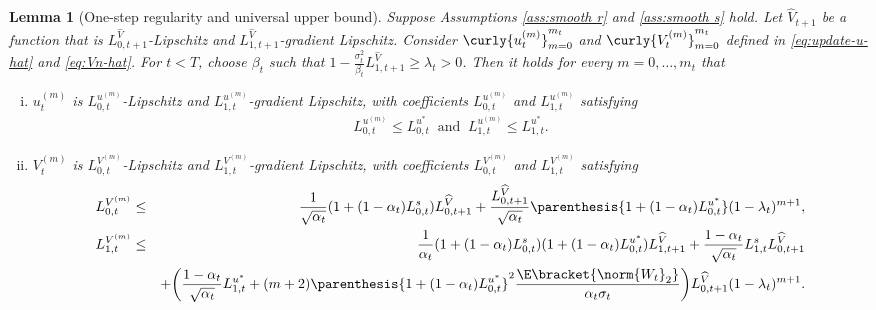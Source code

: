 \documentclass{article}
\newtheorem{Lemma}[Theorem]{Lemma}
\begin{document}
\begin{Lemma}[One-step regularity and universal upper bound]\label{lemma:regularity} Suppose Assumptions \ref{ass:smooth r} and \ref{ass:smooth s} hold.
    Let $\widehat{V}_{t+1}$ be a function that is $ L_{0,t+1}^{\widehat{V}} $-Lipschitz and $ L_{1,t+1}^{\widehat{V}} $-gradient Lipschitz. Consider $\curly{u_t^{(m)}}_{m=0}^{m_t}$ and $\curly{V_t^{(m)}}_{m=0}^{m_t}$ defined in \eqref{eq:update-u-hat} and \eqref{eq:Vn-hat}. For $t < T$, choose $\beta_t$ such that $ 1 - \frac{\sigma_t^2}{\beta_t}L_{1, t+1}^{\widehat{V}} \geq \lambda_{t} > 0  $. Then it holds for every $m = 0, \dots, m_t$ that

\begin{enumerate}[(i)]
    \item    
         $u_{t}^{(m)}$  is  $L_{0, t}^{u^{(m)}}$-Lipschitz and   $L_{1, t}^{u^{(m)}}$-gradient Lipschitz, with coefficients $L_{0,t}^{u^{(m)}} $ and $L_{1,t}^{u^{(m)}}$ satisfying
    \begin{eqnarray}\label{eq:one_step_upp1}
        L_{0,t}^{u^{(m)}} \leq L_{0,t}^{u^{*}} \;\; \text{and}\;\; L_{1,t}^{u^{(m)}} \leq L_{1, t}^{u^*}.
    \end{eqnarray}
    \item  
        $V_{t}^{(m)}$  is  $L_{0, t}^{V^{(m)}}$-Lipschitz and  $L_{1, t}^{V^{(m)}}$-gradient Lipschitz, with coefficients $L_{0, t}^{V^{(m)}}$ and $L_{1, t}^{V^{(m)}}$ satisfying
    \begin{eqnarray}
        L_{0,t}^{V^{(m)}} &\leq& \frac{1}{\sqrt{\alpha_t}}(1 + (1 - \alpha_t)L_{0, t}^{s})
L_{0, t+1}^{\widehat{V}} + \frac{L_{0, t+1}^{\widehat{V}}}{\sqrt{\alpha_{t}}}\parenthesis{1 + (1 - \alpha_{t})L_{0,t}^{u^{*}}}(1- \lambda_t)^{m+1}, \label{eq:lip-0-vm}   \\ 
L_{1,t}^{V^{(m)}} & \leq& \frac{1}{\alpha_{t}}(1 + (1 - \alpha_{t})L_{0, t}^s)(1 + (1 - \alpha_{t})L_{0, t}^{u^*})L_{1,t+1}^{\widehat{V}} + \frac{1 - \alpha_{t}}{\sqrt{\alpha_{t}}}L_{1,t}^s L_{0, t+1}^{\widehat{V}} \nonumber \\ 
& \quad& + \bigg(\frac{1 - \alpha_{t}}{\sqrt{\alpha_{t}}} L_{1, t}^{u^{*}}  + (m+2)\parenthesis{1 + (1 - \alpha_{t})L_{0,t}^{u^{*}}}^{2}\frac{\E\bracket{\norm{W_{t}}_2}}{\alpha_t\sigma_{t}}\bigg)L_{0, t+1}^{\widehat{V}}( 1- \lambda_t)^{m+1}. \label{eq:lip-1-vm}
    \end{eqnarray}

\end{enumerate}



\end{Lemma}
\end{document}
